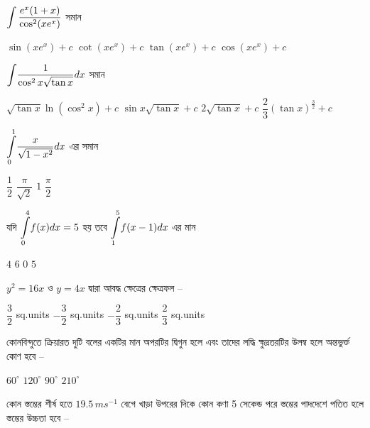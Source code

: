 \documentclass[addpoints]{exam}
\begin{document}
\begin{questions}
\question $ \mathlarger{\int \dfrac{e^{x}(1+x)}{\cos^{2}(xe^{x})}} $ সমান

\begin{oneparchoices}
\choice $ \sin (xe^{x}) +c $
\choice $ \cot (xe^{x}) +c $
\choice $ \tan (xe^{x}) +c $
\choice $ \cos (xe^{x}) +c$
\end{oneparchoices}

\question  $ \mathlarger{\int}\dfrac{1}{\cos^{2}x\sqrt{\tan x}}dx $ সমান

\begin{oneparchoices}
\choice $ \sqrt{\tan x}\ln (\cos^{2} x) + c $
\choice $ \sin x\sqrt{\tan x} + c $
\choice $ 2\sqrt{\tan x} + c $
\choice $ \dfrac{2}{3}(\tan x)^{\frac{3}{2}} + c $
\end{oneparchoices}

\question $ \mathlarger{\int\limits_{0}^{1}}\dfrac{x}{\sqrt{1-x^{2}}}dx $ এর সমান

\begin{oneparchoices}
\choice $ \dfrac{1}{2} $
\choice $ \dfrac{\pi}{\sqrt{2}} $
\choice $ 1 $
\choice $ \dfrac{\pi}{2} $ 
\end{oneparchoices}

\question যদি $ \mathlarger{\int\limits_{0}^{4}}f(x)dx = 5$  হয় তবে $ \mathlarger{\int\limits_{1}^{5}}f(x-1)dx$  এর মান

\begin{oneparchoices}
\choice $ 4 $
\choice $ 6 $
\choice $ 0 $
\choice $ 5 $
\end{oneparchoices}

\question  $ y^{2}=16x $ ও $ y =4x $ দ্বারা আবদ্ধ ক্ষেত্রের ক্ষেত্রফল – 

\begin{oneparchoices}
\choice $ \dfrac{3}{2} $ sq.units
\choice $ -\dfrac{3}{2} $ sq.units
\choice $ -\dfrac{2}{3} $ sq.units
\choice $ \dfrac{2}{3} $ sq.units
\end{oneparchoices}

\question  কোনবিন্দুতে ক্রিয়ারত দুটি বলের একটির মান অপরটির দ্বিগুন হলে এবং তাদের লদ্ধি ক্ষুদ্রতরটির উলম্ব হলে অন্তভুর্ক্ত কোণ হবে –


\begin{oneparchoices}
\choice $ 60^{\circ} $
\choice $ 120^{\circ} $
\choice $ 90^{\circ} $
\choice  $ 210^{\circ} $
\end{oneparchoices}

 \question  কোন স্তম্ভের শীর্ষ হতে $ 19.5\,ms^{-1} $ বেগে খাড়া উপরের দিকে কোন কণা 5 সেকেন্ড পরে স্তম্ভের পাদদেশে পতিত হলে স্তম্ভের উচ্চতা হবে –


\end{questions}
\end{document}
